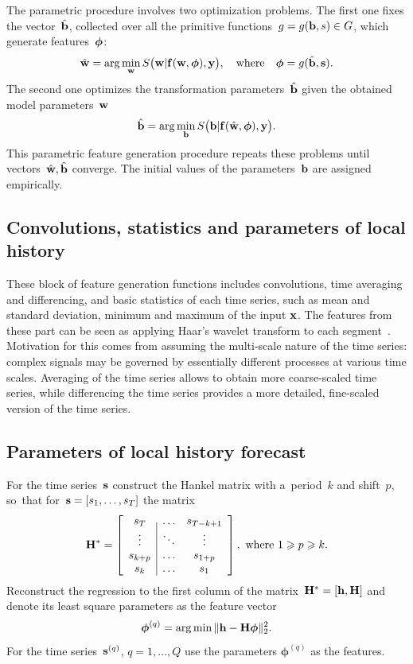 \documentclass[conference]{IEEEtran}
\begin{document}
The parametric procedure involves two optimization problems. The first one fixes the vector~$\hat{{\mathbf{b}}}$, collected over all the primitive functions~$g=g({\mathbf{b}},s) \in G$, which generate features~${\boldsymbol{\phi}}$:
\[
\hat{\mathbf{w}} = \arg\min_{\mathbf{w}} S\bigl(\mathbf{w}|{\mathbf{f}}(\mathbf{w},{\boldsymbol{\phi}}),{\mathbf{y}}\bigr),\quad
\text{where}
\quad {\boldsymbol{\phi}} = g(\hat{{\mathbf{b}}},{\mathbf{s}}).
\]
The second one optimizes the transformation parameters~$\hat{{\mathbf{b}}}$ given the obtained model parameters~$\mathbf{w}$
\[
\hat{{\mathbf{b}}} = \arg\min_{{\mathbf{b}}} S\bigl({\mathbf{b}}|{\mathbf{f}}(\hat{\mathbf{w}},{\boldsymbol{\phi}}),{\mathbf{y}}\bigr).
\]
This parametric feature generation procedure repeats these problems until vectors~$\hat{\mathbf{w}},\hat{{\mathbf{b}}}$ converge. The initial values of the parameters~${\mathbf{b}}$ are assigned empirically.

\subsection{Convolutions, statistics and parameters of local history}
These block of feature generation functions includes convolutions, time averaging and differencing, and basic statistics of each time series, such as mean and standard deviation, minimum and maximum of the input ${\mathbf{x}}$. The features from these part can be seen as applying Haar's wavelet transform to each segment~\cite{Jiang2011}. Motivation for this comes from assuming the multi-scale nature of the time series: complex signals may be governed by essentially different processes at various time scales. Averaging of the time series allows to obtain more coarse-scaled time series, while differencing the time series provides a more detailed, fine-scaled version of the time series.


\subsection{Parameters of local history forecast}
For the time series~${\mathbf{s}}$ construct the Hankel matrix with a~period~$k$ and shift~$p$, so~that for~${\mathbf{s}} = [s_1,\dots,s_T]$ the matrix
\[
\mathbf{H}^* =
\left[ \begin{array}{c|cc}
s_T  & \dots & s_{T-k+1} \\
\vdots & \ddots & \vdots \\
s_{k+p} & \dots & s_{1+p}\\
s_k & \dots & s_1 \\
\end{array}
\right],
\text{~where~} 1\geqslant p \geqslant k .
\]
Reconstruct the regression to the first column of the matrix~$\mathbf{H}^*=[{\mathbf{h}}, \mathbf{H}]$ and denote its least square parameters as the feature vector
\[
\boldsymbol{\phi}^{(q)} = \arg\min \| {\mathbf{h}}-\mathbf{H} \boldsymbol{\phi}\|_2^2.
\]
For the time series~${\mathbf{s}}^{(q)}$, $q=1,\dots, Q$ use the parameters $\boldsymbol{\phi}^{(q)}$ as the features.
\end{document}
